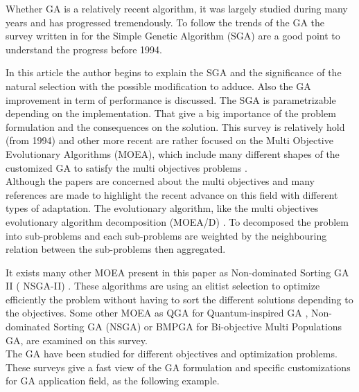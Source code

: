 Whether GA is a relatively recent algorithm, it was largely studied during many years and has progressed tremendously. To follow the trends of the GA  the survey  written in \cite{74*srinivas1994} for the Simple Genetic Algorithm (SGA) are a good point to understand the progress before 1994. 

In this article \cite{74*srinivas1994} the author begins to explain the SGA and the significance of the natural selection with the possible modification to adduce. 
Also the GA improvement  in term of performance is discussed. The SGA is parametrizable depending on the implementation. That give a big importance of the problem formulation and the consequences on the solution.
 This survey is  relatively hold (from 1994) and other more recent are rather focused on the Multi Objective Evolutionary Algorithms (MOEA), which include many different shapes of the customized GA to satisfy the multi objectives problems \cite{75*zhou2011}. \\
Although the papers are concerned about the multi objectives and many references are made to highlight the recent advance on this field with different types of adaptation. The evolutionary algorithm, like the multi objectives evolutionary algorithm decomposition (MOEA/D) \cite{114*zhang2007moea}. To decomposed the problem into sub-problems and each sub-problems are weighted by the neighbouring relation between the sub-problems then aggregated.   

It exists many other MOEA present in this paper as Non-dominated Sorting GA II ( NSGA-II) \cite{69*deb2000}. These algorithms are using an elitist selection to optimize efficiently the problem without having to sort the different solutions depending to the objectives. Some other MOEA as QGA for Quantum-inspired GA \cite{ 69*deb2000,han2000,han2002}%
, Non-dominated Sorting GA  (NSGA) or BMPGA for Bi-objective Multi Populations GA,  are examined on this survey\cite{69*deb2000}. \\
The GA have been studied for different objectives and optimization problems. These surveys  give a fast  view of  the GA formulation and  specific customizations for  GA application field, as the following example.\\

